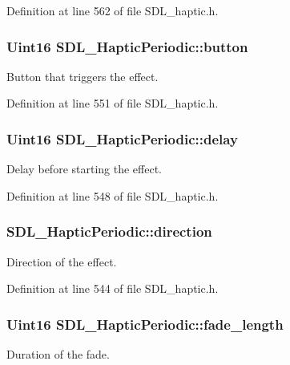 Definition at line 562 of file S\+D\+L\+\_\+haptic.\+h.

\hypertarget{structSDL__HapticPeriodic_a9e0177354f4a285b8c98e4a31cd31752}{
\subsubsection[{button}]{\setlength{\rightskip}{0pt plus 5cm}Uint16 S\+D\+L\+\_\+\+Haptic\+Periodic\+::button}}\label{structSDL__HapticPeriodic_a9e0177354f4a285b8c98e4a31cd31752}
Button that triggers the effect. 

Definition at line 551 of file S\+D\+L\+\_\+haptic.\+h.

\hypertarget{structSDL__HapticPeriodic_a8688d1c7ee6270ed290f6b474aef5ec9}{
\subsubsection[{delay}]{\setlength{\rightskip}{0pt plus 5cm}Uint16 S\+D\+L\+\_\+\+Haptic\+Periodic\+::delay}}\label{structSDL__HapticPeriodic_a8688d1c7ee6270ed290f6b474aef5ec9}
Delay before starting the effect. 

Definition at line 548 of file S\+D\+L\+\_\+haptic.\+h.

\hypertarget{structSDL__HapticPeriodic_a2c4f27d4583187a7a994e79ad49083d3}{
\subsubsection[{direction}]{ S\+D\+L\+\_\+\+Haptic\+Periodic\+::direction}}\label{structSDL__HapticPeriodic_a2c4f27d4583187a7a994e79ad49083d3}
Direction of the effect. 

Definition at line 544 of file S\+D\+L\+\_\+haptic.\+h.

\hypertarget{structSDL__HapticPeriodic_ae1c186d02304eae142a62dca72f50fa8}{
\subsubsection[{fade\+\_\+length}]{\setlength{\rightskip}{0pt plus 5cm}Uint16 S\+D\+L\+\_\+\+Haptic\+Periodic\+::fade\+\_\+length}}\label{structSDL__HapticPeriodic_ae1c186d02304eae142a62dca72f50fa8}
Duration of the fade. 

